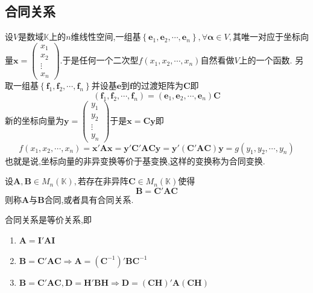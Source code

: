 \subsection{合同关系}
设$V$是数域$\mathbb{K}$上的$n$维线性空间,一组基$\left\{
    \bm{e}_1,\bm{e}_2,\cdots,\bm{e}_n
    \right\},\forall\bm{\alpha}\in V,$其唯一对应于坐标向量$\bm{x}=\begin{pmatrix}
        x_1\\x_2\\\vdots\\x_n
        \end{pmatrix}$.于是任何一个二次型$
f\left(
    x_1,x_2,\cdots,x_n
    \right)
        $自然看做$V$上的一个函数.
另取一组基$\left\{
    \bm{f}_1,\bm{f}_2,\cdots,\bm{f}_n
\right\}$并设基$\bm{e}$到$\bm{f}$的过渡矩阵为$\bm{C}$即\[
\left(
    \bm{f}_1,\bm{f}_2,\cdots,\bm{f}_n
\right)=\left(
    \bm{e}_1,\bm{e}_2,\cdots,\bm{e}_n
\right)\bm{C}
\]新的坐标向量为$\bm{y}=\begin{pmatrix}
    y_1\\y_2\\\vdots\\y_n
\end{pmatrix}$于是$\bm{x}=\bm{Cy}$即\[
f\left(
    x_1,x_2,\cdots,x_n
\right)=\bm{x}'\bm{Ax}=\bm{y}'\bm{C}'\bm{ACy}=\bm{y}'\left(
    \bm{C}'\bm{AC}
\right)\bm{y}=g\left(
    y_1,y_2,\cdots,y_n
\right)
\]也就是说,坐标向量的非异变换等价于基变换,这样的变换称为合同变换.
\begin{formal}
    \begin{definition}[合同关系的定义]\label{def:合同关系的定义}
        设$\bm{A},\bm{B}\in M_n\left(\mathbb{K}\right),$若存在非异阵$\bm{C}\in M_n\left(\mathbb{K}\right)$使得\[
        \bm{B}=\bm{C}'\bm{AC}
        \]则称$\bm{A}$与$\bm{B}$合同,或者具有合同关系.
    \end{definition}
\end{formal}
\begin{formal}
    \begin{theorem}[合同关系的性质]\label{thm:合同关系的性质}
        合同关系是等价关系,即\begin{enumerate}[label={\textup{(\arabic*)}}]
            \item $\bm{A}=\bm{I}'\bm{AI}$
            \item $\bm{B}=\bm{C}'\bm{AC}\Longrightarrow\bm{A}=\left(\bm{C}^{-1}\right)'\bm{BC}^{-1}$
            \item $\bm{B}=\bm{C}'\bm{AC},\bm{D}=\bm{H}'\bm{BH}\Longrightarrow\bm{D}=\left(\bm{CH}\right)'\bm{A}\left(\bm{CH}\right)$
        \end{enumerate}
    \end{theorem}
\end{formal}
